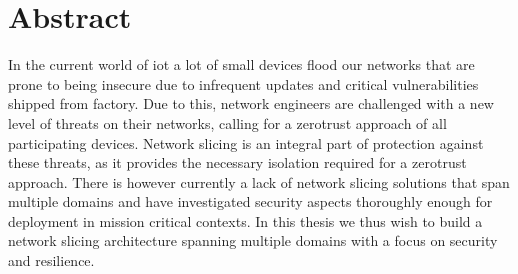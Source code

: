 \chapter*{\centering Abstract}
In the current world of \acrshort{iot} a lot of small devices flood our networks that are prone to being insecure due to infrequent updates and critical vulnerabilities shipped from factory. Due to this, network engineers are challenged with a new level of threats on their networks, calling for a \gls{zerotrust} approach of all participating devices. Network slicing is an integral part of protection against these threats, as it provides the necessary isolation required for a \gls{zerotrust} approach. There is however currently a lack of network slicing solutions that span multiple domains and have investigated security aspects thoroughly enough for deployment in mission critical contexts. In this thesis we thus wish to build a network slicing architecture spanning multiple domains with a focus on security and resilience.